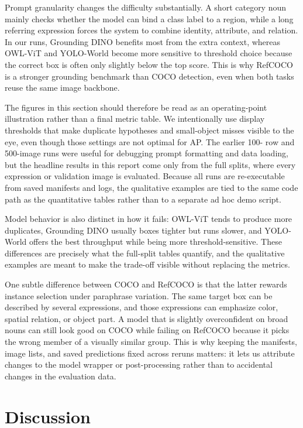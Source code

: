 \documentclass[conference]{IEEEtran}
\begin{document}
Prompt granularity changes the difficulty substantially. A short category noun
mainly checks whether the model can bind a class label to a region, while a
long referring expression forces the system to combine identity, attribute,
and relation. In our runs, Grounding DINO benefits most from the extra context,
whereas OWL-ViT and YOLO-World become more sensitive to threshold choice
because the correct box is often only slightly below the top score. This is
why RefCOCO is a stronger grounding benchmark than COCO detection, even when
both tasks reuse the same image backbone.

The figures in this section should therefore be read as an operating-point
illustration rather than a final metric table. We intentionally use display
thresholds that make duplicate hypotheses and small-object misses visible to
the eye, even though those settings are not optimal for AP. The earlier 100-
row and 500-image runs were useful for debugging prompt formatting and data
loading, but the headline results in this report come only from the full
splits, where every expression or validation image is evaluated. Because all
runs are re-executable from saved manifests and logs, the qualitative examples
are tied to the same code path as the quantitative tables rather than to a
separate ad hoc demo script.

Model behavior is also distinct in how it fails: OWL-ViT tends to produce more
duplicates, Grounding DINO usually boxes tighter but runs slower, and
YOLO-World offers the best throughput while being more threshold-sensitive.
These differences are precisely what the full-split tables quantify, and the
qualitative examples are meant to make the trade-off visible without replacing
the metrics.

One subtle difference between COCO and RefCOCO is that the latter rewards
instance selection under paraphrase variation. The same target box can be
described by several expressions, and those expressions can emphasize color,
spatial relation, or object part. A model that is slightly overconfident on
broad nouns can still look good on COCO while failing on RefCOCO because it
picks the wrong member of a visually similar group. This is why keeping the
manifests, image lists, and saved predictions fixed across reruns matters: it
lets us attribute changes to the model wrapper or post-processing rather than
to accidental changes in the evaluation data.
\FloatBarrier

\section{Discussion}
\end{document}
